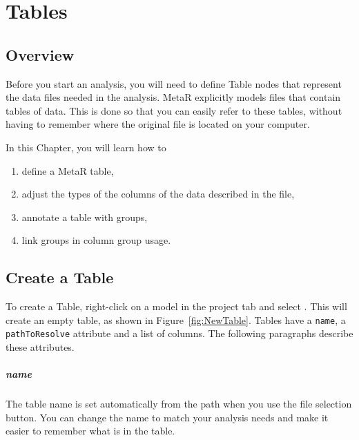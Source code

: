 


\chapter{Tables}\label{chap:Tables}
\section{Overview}
Before you start an analysis, you will need to define Table nodes that represent the data files needed in the analysis. MetaR explicitly models files that contain tables of data. This is done so that you can easily refer to these tables, without having to remember where the original file is located on your computer. 

\noindent In this Chapter, you will learn how to 
\begin{enumerate}
	\item define a MetaR table,
	\item  adjust the types of the columns of the data described in the file,
	\item annotate a table with groups,
	\item link groups in column group usage.
\end{enumerate}

\section{Create a Table}\label{sec:CreateATable}
To create a Table, right-click on a model in the project tab and select . This will create an empty table, as shown in Figure~\ref{fig:NewTable}. Tables have a \texttt{name}, a \texttt{pathToResolve} attribute and a list of columns. The following paragraphs describe these attributes.
\paragraph{name}
The table name is set automatically from the path when you use the file selection button. You can change the name to match your analysis needs and make it easier to remember what is in the table.
